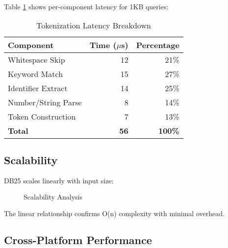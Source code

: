 \documentclass[conference]{IEEEtran}
\begin{document}
Table \ref{tab:latency} shows per-component latency for 1KB queries:

\begin{table}[htbp]
\centering
\caption{Tokenization Latency Breakdown}
\label{tab:latency}
\begin{tabular}{|l|r|r|}
\hline
\textbf{Component} & \textbf{Time ($\mu$s)} & \textbf{Percentage} \\
\hline
Whitespace Skip & 12 & 21\% \\
Keyword Match & 15 & 27\% \\
Identifier Extract & 14 & 25\% \\
Number/String Parse & 8 & 14\% \\
Token Construction & 7 & 13\% \\
\hline
\textbf{Total} & \textbf{56} & \textbf{100\%} \\
\hline
\end{tabular}
\end{table}

\subsection{Scalability}

DB25 scales linearly with input size:

\begin{figure}[htbp]
\centering
{}
\caption{Scalability Analysis}
\label{fig:scalability}
\end{figure}

The linear relationship confirms O(n) complexity with minimal overhead.

\subsection{Cross-Platform Performance}
\end{document}
